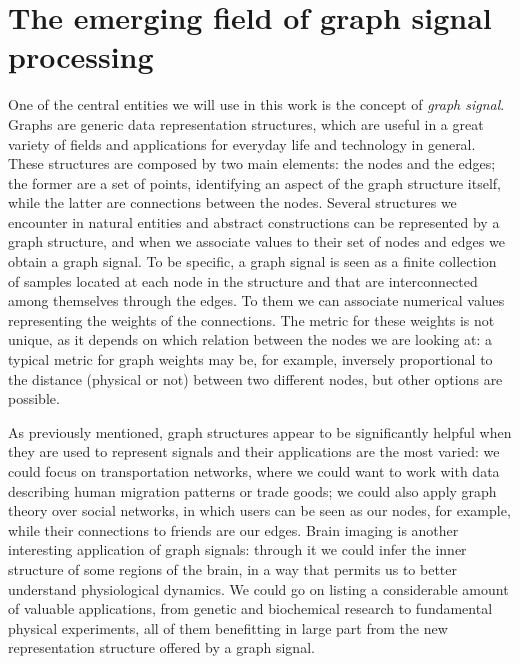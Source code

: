 \chapter{The emerging field of graph signal processing}
One of the central entities we will use in this work is the concept of \textit{graph signal}.\\
Graphs are generic data representation structures, which are useful in a great variety of fields and applications for everyday life and technology in general. These structures are composed by two main elements: the nodes and the edges; the former are a set of points, identifying an aspect of the graph structure itself, while the latter are connections between the nodes. Several structures we encounter in natural entities and abstract constructions can be represented by a graph structure, and when we associate values to their set of nodes and edges we obtain a graph signal. To be specific, a graph signal is seen as a finite collection of samples located at each node in the structure and that are interconnected among themselves through the edges. To them we can associate numerical values representing the weights of the connections. The metric for these weights is not unique, as it depends on which relation between the nodes we are looking at: a typical metric for graph weights may be, for example, inversely proportional to the distance (physical or not) between two different nodes, but other options are possible.

As previously mentioned, graph structures appear to be significantly helpful when they are used to represent signals and their applications are the most varied: we could focus on transportation networks, where we could want to work with data describing human migration patterns or trade goods; we could also apply graph theory over social networks, in which users can be seen as our nodes, for example, while their connections to friends are our edges. \cite{Ortega2017} Brain imaging is another interesting application of graph signals: through it we could infer the inner structure of some regions of the brain, in a way that permits us to better understand physiological dynamics. \cite{Shuman2013} We could go on listing a considerable amount of valuable applications, from genetic and biochemical research to fundamental physical experiments, all of them benefitting in large part from the new representation structure offered by a graph signal.

